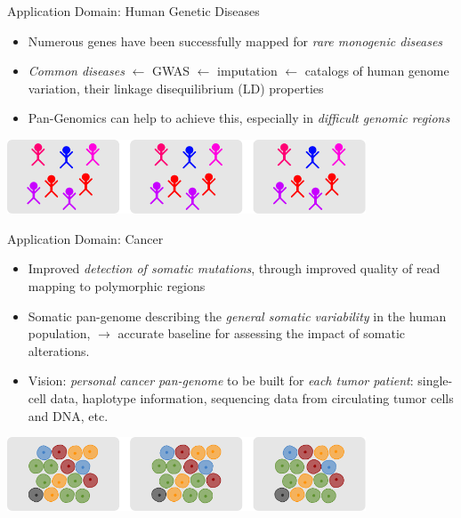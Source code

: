 \documentclass[notes=hide]{beamer}
\newcommand{\0}{\ensuremath{\mathtt{0}}}
\newcommand{\1}{\ensuremath{\mathtt{1}}}
\begin{document}
\begin{frame}{Application Domain: Human Genetic Diseases}
\begin{itemize}
 \item Numerous genes have been successfully mapped for \emph{rare monogenic diseases}
 \item \emph{Common diseases} $\leftarrow$ GWAS $\leftarrow$ imputation $\leftarrow$ catalogs of human genome variation, their linkage disequilibrium (LD) properties
 \item Pan-Genomics can help to achieve this, especially in \emph{difficult genomic regions}
\end{itemize}
\begin{center}
\includegraphics[width=0.8\textwidth]{figs/data-sources-human}
\end{center}
\end{frame}

\begin{frame}{Application Domain: Cancer}
\begin{itemize}
 \item Improved \emph{detection of somatic mutations}, through improved quality of read mapping to polymorphic regions
 \item Somatic pan-genome describing the \emph{general somatic variability} in the human population, $\rightarrow$ accurate baseline for assessing the impact of somatic alterations.
 \item Vision: \emph{personal cancer pan-genome} to be built for \emph{each tumor patient}:  single-cell data, haplotype information, sequencing data from circulating tumor cells and DNA, etc.
\end{itemize}
\begin{center}
\includegraphics[width=0.8\textwidth]{figs/data-sources-cancer}
\end{center}
\end{frame}
\end{document}

